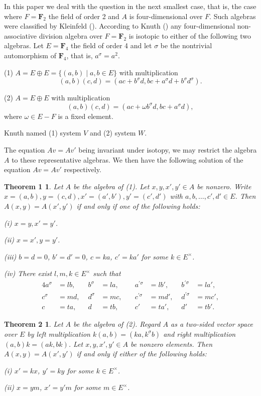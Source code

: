\documentclass{article}
\newtheorem*{thm1}{Theorem 1}
\newtheorem*{thm2}{Theorem 2}
\newcommand{\bF}{\mathbf{F}}
\begin{document}
In this paper we deal with the question in the next smallest case, that is, the case where $F=\bF_2$ the field of order 2 and $A$ is four-dimensional over $F$.
Such algebras were classified by Kleinfeld (\cite{Klein}). According to  Knuth (\cite{Knu}) any four-dimensional non-associative division algebra over $F=\bF_2$ is isotopic to either of the following two algebras.
Let $E=\bF_4$ the field of order 4 and let $\sigma$ be the nontrivial automorphism of $\bF_4$, that is, $a^{\sigma}=a^2$. 

\noindent
(1)  $A=E\oplus E=\{(a,b)\mid a,b\in E\}$ with multiplication 
$$
(a,b)(c,d)=(ac+b^{\sigma}d, bc+a^{\sigma}d+b^{\sigma}d^{\sigma}).
$$

\noindent
(2)  $A=E\oplus E$ with multiplication 
$$
(a,b)(c,d)=(ac+\omega b^{\sigma}d, bc+a^{\sigma}d),
$$
where $\omega\in E-F$ is a fixed element.

Knuth named (1) system $V$ and  (2)  system $W$.

The equation $Av=Av'$ being invariant under isotopy, 
we may restrict the algebra $A$ to  
 these representative algebras.
We then have the following solution of the equation $Av=Av'$ respectively.



\begin{thm1} Let $A$ be the algebra of (1).
Let $x,y,x',y'\in A$ be nonzero.
Write $x=(a,b), y=(c,d), x'=(a',b'),y'=(c',d')$
 with $a,b,\dots,c',d'\in E$.
Then $A(x,y)=A(x',y')$ if and only if one of the following holds:

(i) $x=y, x'=y'$.

(ii) $x=x', y=y'$.

(iii) $b=d=0$, $b'=d'=0$, $c=k a$, $c'=k a'$ for some $k\in E^{\times}$.

(iv) There exist $l,m,k\in E^{\times}$ such that
\begin{alignat*}{4}
a^{\sigma}&=l b, \quad& b^{\sigma}&=l a, \quad&
a^{\prime\sigma}&=l b',\quad& b^{\prime\sigma}&=l a',\\
c^{\sigma}&=m d, & d^{\sigma}&= mc, \quad&
c^{\prime\sigma}&=m d', & d^{\prime\sigma}&=m c',\\
c&=t a, & d&=t b, \quad&
c' &=t a', & d'&=t b'.
\end{alignat*}

\end{thm1}



\begin{thm2} 
Let $A$ be the algebra of (2).
Regard $A$ as a two-sided vector space over $E$ by left multiplication
$k(a,b)=(ka,k^{\sigma}b)$
and right multiplication
$(a,b)k=(ak,bk)$.
Let $x,y,x',y'\in A$ be nonzero elements. 
Then $A(x,y)=A(x',y')$ if and only if either of the following holds:

(i) $x'=k x$, $y'=k y$ for some $k\in E^{\times}$.

(ii) $x=ym$, $x'=y'm$ for some $m\in E^{\times}$.


\end{thm2}
\end{document}
